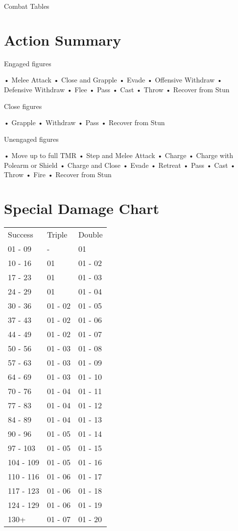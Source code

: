 \begin{Tables}{Combat Tables}
\begin{multicols}{3}

\section{Action Summary}

Engaged figures  

• Melee Attack  
• Close and Grapple  
• Evade  
• Offensive Withdraw  
• Defensive Withdraw  
• Flee  
• Pass  
• Cast  
• Throw  
• Recover from Stun 

Close figures  

• Grapple  
• Withdraw  
• Pass  
• Recover from Stun 

Unengaged figures  

• Move up to full TMR  
• Step and Melee Attack  
• Charge  
• Charge with Polearm or Shield  
• Charge and Close  
• Evade  
• Retreat  
• Pass  
• Cast  
• Throw  
• Fire  
• Recover from Stun 
 

\section{Special Damage Chart}

\begin{tabularx}{\columnwidth}{XXX}
Success		& Triple	& Double \\
01 - 09		& -		& 01 \\
10 - 16		& 01		& 01 - 02 \\
17 - 23		& 01		& 01 - 03 \\
24 - 29		& 01		& 01 - 04 \\
30 - 36		& 01 - 02	& 01 - 05 \\
37 - 43		& 01 - 02	& 01 - 06 \\
44 - 49		& 01 - 02	& 01 - 07 \\
50 - 56		& 01 - 03	& 01 - 08 \\
57 - 63		& 01 - 03	& 01 - 09 \\
64 - 69		& 01 - 03	& 01 - 10 \\
70 - 76		& 01 - 04	& 01 - 11 \\
77 - 83		& 01 - 04	& 01 - 12 \\
84 - 89		& 01 - 04	& 01 - 13 \\
90 - 96		& 01 - 05	& 01 - 14 \\
97 - 103	& 01 - 05	& 01 - 15 \\
104 - 109	& 01 - 05	& 01 - 16 \\
110 - 116	& 01 - 06	& 01 - 17 \\
117 - 123	& 01 - 06	& 01 - 18 \\
124 - 129	& 01 - 06	& 01 - 19 \\
130+		& 01 - 07	& 01 - 20 \\
\end{tabularx}
\end{multicols}
\end{Tables}
